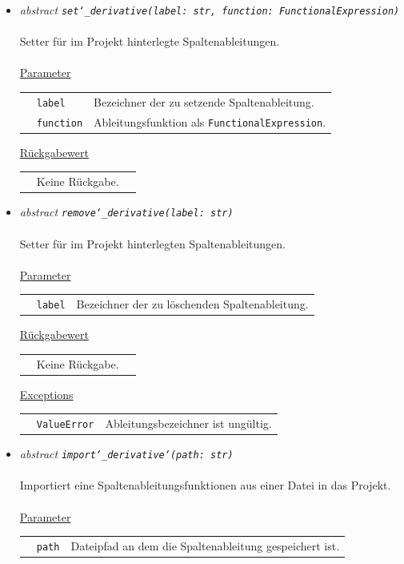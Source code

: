 \documentclass{article}
\begin{document}
\begin{itemize}
\begin{itemize}
\item \textit{\flqq{}abstract\frqq} \texttt{\textit{set\char`_derivative(label: str, function: FunctionalExpression)}}\\\\
Setter für im Projekt hinterlegte Spaltenableitungen.
\\\\
\underline{Parameter}\\
\begin{tabular}{lll}
 & \texttt{label} & Bezeichner der zu setzende Spaltenableitung.\\
 & \texttt{function} & Ableitungsfunktion als \texttt{FunctionalExpression}.\\
\end{tabular}

\underline{Rückgabewert}\\
\begin{tabular}{lll}
 & Keine Rückgabe.\\
\end{tabular}


\item \textit{\flqq{}abstract\frqq} \texttt{\textit{remove\char`_derivative(label: str)}}\\\\
Setter für im Projekt hinterlegten Spaltenableitungen.
\\\\
\underline{Parameter}\\
\begin{tabular}{lll}
 & \texttt{label} & Bezeichner der zu löschenden Spaltenableitung.\\
\end{tabular}

\underline{Rückgabewert}\\
\begin{tabular}{lll}
 & Keine Rückgabe.\\
\end{tabular}

\underline{Exceptions}\\
\begin{tabular}{lll}
 & \texttt{ValueError} & Ableitungsbezeichner ist ungültig.\\
\end{tabular}


\item \textit{\flqq{}abstract\frqq} \texttt{\textit{import\char`_derivative\char`(path: str)}}\\\\
Importiert eine Spaltenableitungsfunktionen aus einer Datei in das Projekt.
\\\\
\underline{Parameter}\\
\begin{tabular}{lll}
 & \texttt{path} & Dateipfad an dem die Spaltenableitung gespeichert ist.\\
\end{tabular}


\end{itemize}
\end{itemize}
\end{document}

